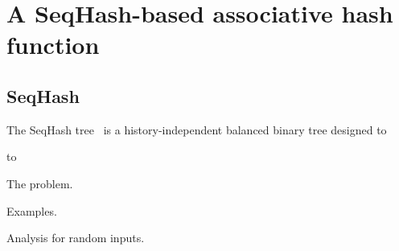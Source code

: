 \section{A SeqHash-based associative hash function}
\label{s:seqhash}

\subsection{SeqHash}

The SeqHash tree~\cite{versum:ccs14} is a history-independent balanced binary
tree designed to 


to 

The problem.

Examples.

Analysis for random inputs.
